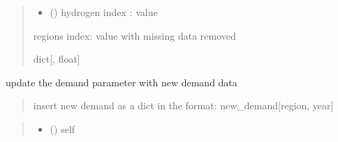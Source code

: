 \documentclass[letterpaper,10pt,english]{sphinxmanual}
\begin{document}
\begin{fulllineitems}
\begin{fulllineitems}
\begin{quote}
\begin{description}
\begin{itemize}
\item {} 
\sphinxAtStartPar
{} (\sphinxstyleliteralemphasis{\sphinxupquote{{[}}}{\hyperref[\detokenize{src.integrator.utilities:src.integrator.utilities.HI}]{\sphinxcrossref{\sphinxstyleliteralemphasis{\sphinxupquote{HI}}}}}\sphinxstyleliteralemphasis{\sphinxupquote{, }}\sphinxstyleliteralemphasis{\sphinxupquote{{]}}}) \textendash{} hydrogen index : value

\end{itemize}

\sphinxAtStartPar
regions index: value with missing data removed

\sphinxAtStartPar
dict{[}{\hyperref[\detokenize{src.integrator.utilities:src.integrator.utilities.HI}]{}}, float{]}

\end{description}\end{quote}

\end{fulllineitems}


\begin{fulllineitems}
\label{\detokenize{src.models.hydrogen.model.h2_model:src.models.hydrogen.model.h2_model.H2Model._update_demand}}
\pysigstartsignatures
\pysiglinewithargsret
{}
{}
{}
\pysigstopsignatures
\sphinxAtStartPar
update the demand parameter with new demand data
\begin{quote}

\sphinxAtStartPar
insert new demand as a dict in the format: new\_demand{[}region, year{]}
\end{quote}
\begin{quote}\begin{description}
\begin{itemize}
\item {} 
\sphinxAtStartPar
{} ({\hyperref[\detokenize{src.models.hydrogen.model.h2_model:src.models.hydrogen.model.h2_model.H2Model}]{}}) \textendash{} self


\end{itemize}
\end{description}
\end{quote}
\end{fulllineitems}
\end{fulllineitems}
\end{document}

